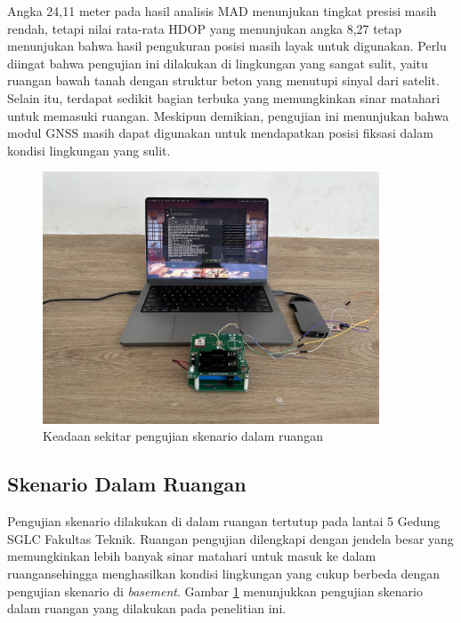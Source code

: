 Angka 24,11 meter pada hasil analisis MAD menunjukan tingkat presisi masih rendah, tetapi nilai rata-rata HDOP yang menunjukan angka 8,27 tetap menunjukan bahwa hasil pengukuran posisi masih layak untuk digunakan. Perlu diingat bahwa pengujian ini dilakukan di lingkungan yang sangat sulit, yaitu ruangan bawah tanah dengan struktur beton yang menutupi sinyal dari satelit. Selain itu, terdapat sedikit bagian terbuka yang memungkinkan sinar matahari untuk memasuki ruangan. Meskipun demikian, pengujian ini menunjukan bahwa modul GNSS masih dapat digunakan untuk mendapatkan posisi fiksasi dalam kondisi lingkungan yang sulit.

\begin{figure}[H]
	\centering
	\includegraphics[width=10cm]{contents/chapter-4/2-skenario-indoor/keadaan.jpg}
	\caption{Keadaan sekitar pengujian skenario dalam ruangan}
	\label{Fig: indoor-keadaan}
\end{figure}

\subsection{Skenario Dalam Ruangan}
Pengujian skenario dilakukan di dalam ruangan tertutup pada lantai 5 Gedung SGLC Fakultas Teknik. Ruangan pengujian dilengkapi dengan jendela besar yang memungkinkan lebih banyak sinar matahari untuk masuk ke dalam ruangansehingga menghasilkan kondisi lingkungan yang cukup berbeda dengan pengujian skenario di \textit{basement}. Gambar \ref{Fig: indoor-keadaan} menunjukkan pengujian skenario dalam ruangan yang dilakukan pada penelitian ini.

